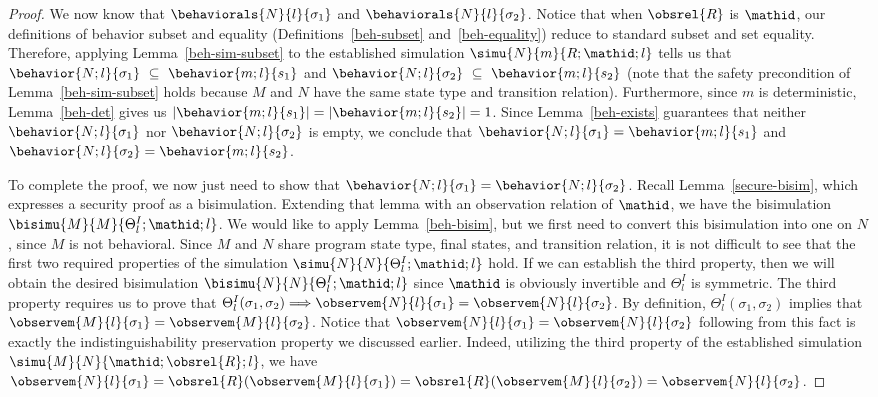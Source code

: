 \begin{proof}
We now know that $\behaviorals{N}{l}{\sigma_1}$ and 
$\behaviorals{N}{l}{\sigma_2}$. Notice that
when $\obsrel{R}$ is $\mathid$, our definitions of behavior subset and
equality (Definitions~\ref{beh-subset} and~\ref{beh-equality}) reduce
to standard subset and set equality. Therefore, applying 
Lemma~\ref{beh-sim-subset} to the established simulation
$\simu{N}{m}{R;\mathid;l}$ tells us that 
$\behavior{N;l}{\sigma_1}~\subseteq~\behavior{m;l}{s_1}$
and $\behavior{N;l}{\sigma_2}~\subseteq~\behavior{m;l}{s_2}$ (note that
the safety precondition of Lemma~\ref{beh-sim-subset} holds because $M$ and $N$
have the same state type and transition relation). Furthermore,
since $m$ is deterministic, Lemma~\ref{beh-det} gives us 
$| \behavior{m;l}{s_1} | = | \behavior{m;l}{s_2} | = 1$. Since 
Lemma~\ref{beh-exists} guarantees that neither $\behavior{N;l}{\sigma_1}$ nor
$\behavior{N;l}{\sigma_2}$ is empty, we conclude that
$\behavior{N;l}{\sigma_1} = \behavior{m;l}{s_1}$
and $\behavior{N;l}{\sigma_2} = \behavior{m;l}{s_2}$.

To complete the proof, we now just need to show that 
$\behavior{N;l}{\sigma_1} = \behavior{N;l}{\sigma_2}$. Recall
Lemma~\ref{secure-bisim}, which expresses a security proof as 
a bisimulation. Extending that lemma with an observation relation
of $\mathid$, we have the bisimulation $\bisimu{M}{M}{\Theta^{I}_l;\mathid;l}$.
We would like to apply Lemma~\ref{beh-bisim}, but we first need
to convert this bisimulation into one on $N$, since $M$ is not
behavioral. Since $M$ and $N$ share program state type, final states,
and transition relation, it is not difficult to see that the first
two required properties of the simulation $\simu{N}{N}{\Theta^{I}_l;\mathid;l}$ 
hold. If we can establish the third property, then we will obtain the
desired bisimulation $\bisimu{N}{N}{\Theta^{I}_l;\mathid;l}$ since $\mathid$ 
is obviously invertible and $\Theta^{I}_l$ is symmetric. The third
property requires us to prove that 
$\Theta^{I}_l(\sigma_1,\sigma_2) \Longrightarrow 
\observem{N}{l}{\sigma_1} = \observem{N}{l}{\sigma_2}$.
By definition, $\Theta^{I}_l(\sigma_1,\sigma_2)$ implies that
$\observem{M}{l}{\sigma_1} = \observem{M}{l}{\sigma_2}$.
Notice that $\observem{N}{l}{\sigma_1} = \observem{N}{l}{\sigma_2}$
following from this fact is exactly the indistinguishability 
preservation property we discussed earlier. Indeed, utilizing the 
third property of the established simulation 
$\simu{M}{N}{\mathid;\obsrel{R};l}$, we
have $\observem{N}{l}{\sigma_1} = \obsrel{R}(\observem{M}{l}{\sigma_1}) = 
\obsrel{R}(\observem{M}{l}{\sigma_2}) = \observem{N}{l}{\sigma_2}$.


\end{proof}
